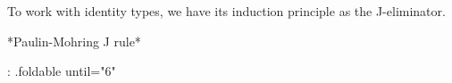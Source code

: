 To work with identity types, we have its induction principle as the
J-eliminator.

*Paulin-Mohring J rule*

{: .foldable until="6" }
\begin{code}%
\>[0]\<%
\\
\>[0][@{}l@{\AgdaIndent{0}}]%
\>[2]\AgdaSymbol{:}\AgdaSpace{}%
\AgdaSpace{}%
\AgdaSymbol{\{}\AgdaSpace{}%
\AgdaSymbol{:}\AgdaSpace{}%
\AgdaSpace{}%
\AgdaSymbol{\}}\AgdaSpace{}%
\AgdaSymbol{\{}\AgdaSpace{}%
\AgdaSymbol{:}\AgdaSpace{}%
\AgdaSymbol{\}}\<%
\\
%
\>[2]\AgdaSpace{}%
\AgdaSymbol{(}\AgdaSpace{}%
\AgdaSymbol{:}\AgdaSpace{}%
\AgdaSymbol{(}\AgdaSpace{}%
\AgdaSymbol{:}\AgdaSpace{}%
\AgdaSymbol{)}\AgdaSpace{}%
\AgdaSymbol{(}\AgdaSpace{}%
\AgdaSymbol{:}\AgdaSpace{}%
\AgdaSpace{}%
\AgdaOperator{\AgdaDatatype{==}}\AgdaSpace{}%
\AgdaSymbol{)}\AgdaSpace{}%
\AgdaSpace{}%
\AgdaSpace{}%
\AgdaSymbol{)}\<%
\\
%
\>[2]\AgdaSpace{}%
\AgdaSymbol{(}\AgdaSpace{}%
\AgdaSymbol{:}\AgdaSpace{}%
\AgdaSpace{}%
\AgdaSpace{}%
\AgdaSymbol{)}\<%
\\
%
\>[2]\AgdaComment{----------------------------------------}\<%
\\
%
\>[2]\AgdaSpace{}%
\AgdaSymbol{\{}\AgdaSpace{}%
\AgdaSymbol{:}\AgdaSpace{}%
\AgdaSymbol{\}}\AgdaSpace{}%
\AgdaSymbol{(}\AgdaSpace{}%
\AgdaSymbol{:}\AgdaSpace{}%
\AgdaSpace{}%
\AgdaOperator{\AgdaDatatype{==}}\AgdaSpace{}%
\AgdaSymbol{)}\AgdaSpace{}%
\AgdaSpace{}%
\AgdaSpace{}%
\AgdaSpace{}%
\<%
\\
%
\\[\AgdaEmptyExtraSkip]%
\>[0]\AgdaSpace{}%
\AgdaSymbol{\{}\AgdaSpace{}%
\AgdaSymbol{=}\AgdaSpace{}%
\AgdaSymbol{\}}\AgdaSpace{}%
\AgdaSpace{}%
\AgdaSpace{}%
\AgdaSpace{}%
\AgdaSymbol{=}\AgdaSpace{}%
\<%
\end{code}

